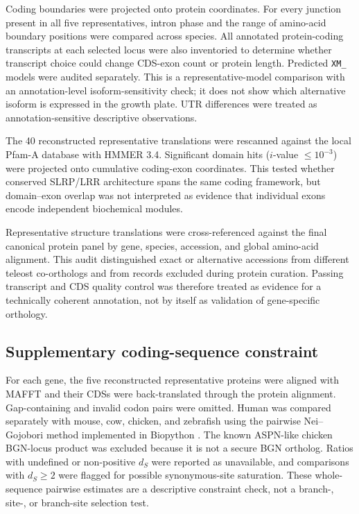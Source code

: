 Coding boundaries were projected onto protein coordinates. For every junction
present in all five representatives, intron phase and the range of amino-acid
boundary positions were compared across species. All annotated protein-coding
transcripts at each selected locus were also inventoried to determine whether
transcript choice could change CDS-exon count or protein length. Predicted
\texttt{XM\_} models were audited separately. This is a representative-model
comparison with an annotation-level isoform-sensitivity check; it does not show
which alternative isoform is expressed in the growth plate. UTR differences
were treated as annotation-sensitive descriptive observations.

The 40 reconstructed representative translations were rescanned against the
local Pfam-A database with HMMER 3.4. Significant domain hits
($i$-value $\leq10^{-3}$) were projected onto cumulative coding-exon
coordinates. This tested whether conserved SLRP/LRR architecture spans the same
coding framework, but domain--exon overlap was not interpreted as evidence that
individual exons encode independent biochemical modules.

Representative structure translations were cross-referenced against the final
canonical protein panel by gene, species, accession, and global amino-acid
alignment. This audit distinguished exact or alternative accessions from
different teleost co-orthologs and from records excluded during protein
curation. Passing transcript and CDS quality control was therefore treated as
evidence for a technically coherent annotation, not by itself as validation of
gene-specific orthology.

\subsection{Supplementary coding-sequence constraint}
\label{subsec:codon-constraint}

For each gene, the five reconstructed representative proteins were aligned with
MAFFT and their CDSs were back-translated through the protein alignment.
Gap-containing and invalid codon pairs were omitted. Human was compared
separately with mouse, cow, chicken, and zebrafish using the pairwise
Nei--Gojobori method implemented in Biopython \citep{NeiGojobori1986}. The known
ASPN-like chicken BGN-locus product was excluded because it is not a secure BGN
ortholog. Ratios with undefined or non-positive $d_S$ were reported as
unavailable, and comparisons with $d_S\geq2$ were flagged for possible
synonymous-site saturation. These whole-sequence pairwise estimates are a
descriptive constraint check, not a branch-, site-, or branch-site selection
test.


